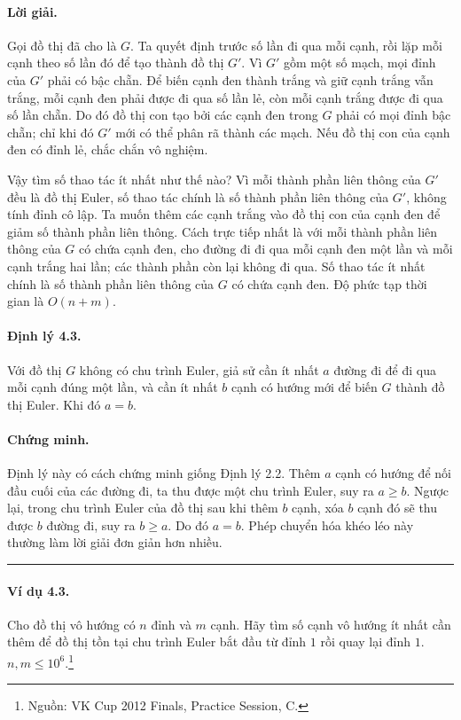 \documentclass[11pt]{article}
\newcommand{\qedmark}{\hfill\rule{0.7ex}{0.7ex}}
\begin{document}
\paragraph{Lời giải.}
Gọi đồ thị đã cho là \(G\). Ta quyết định trước số lần đi qua mỗi cạnh, rồi lặp
mỗi cạnh theo số lần đó để tạo thành đồ thị \(G'\). Vì \(G'\) gồm một số mạch,
mọi đỉnh của \(G'\) phải có bậc chẵn. Để biến cạnh đen thành trắng và giữ cạnh
trắng vẫn trắng, mỗi cạnh đen phải được đi qua số lần lẻ, còn mỗi cạnh trắng
được đi qua số lần chẵn. Do đó đồ thị con tạo bởi các cạnh đen trong \(G\) phải
có mọi đỉnh bậc chẵn; chỉ khi đó \(G'\) mới có thể phân rã thành các mạch. Nếu
đồ thị con của cạnh đen có đỉnh lẻ, chắc chắn vô nghiệm.

Vậy tìm số thao tác ít nhất như thế nào? Vì mỗi thành phần liên thông của
\(G'\) đều là đồ thị Euler, số thao tác chính là số thành phần liên thông của
\(G'\), không tính đỉnh cô lập. Ta muốn thêm các cạnh trắng vào đồ thị con của
cạnh đen để giảm số thành phần liên thông. Cách trực tiếp nhất là với mỗi thành
phần liên thông của \(G\) có chứa cạnh đen, cho đường đi đi qua mỗi cạnh đen
một lần và mỗi cạnh trắng hai lần; các thành phần còn lại không đi qua. Số thao
tác ít nhất chính là số thành phần liên thông của \(G\) có chứa cạnh đen. Độ
phức tạp thời gian là \(O(n+m)\).

\paragraph{Định lý 4.3.}
Với đồ thị \(G\) không có chu trình Euler, giả sử cần ít nhất \(a\) đường đi để
đi qua mỗi cạnh đúng một lần, và cần ít nhất \(b\) cạnh có hướng mới để biến
\(G\) thành đồ thị Euler. Khi đó \(a=b\).

\paragraph{Chứng minh.}
Định lý này có cách chứng minh giống Định lý 2.2. Thêm \(a\) cạnh có hướng để
nối đầu cuối của các đường đi, ta thu được một chu trình Euler, suy ra
\(a\ge b\). Ngược lại, trong chu trình Euler của đồ thị sau khi thêm \(b\) cạnh,
xóa \(b\) cạnh đó sẽ thu được \(b\) đường đi, suy ra \(b\ge a\). Do đó
\(a=b\). Phép chuyển hóa khéo léo này thường làm lời giải đơn giản hơn nhiều.
\qedmark

\paragraph{Ví dụ 4.3.}
Cho đồ thị vô hướng có \(n\) đỉnh và \(m\) cạnh. Hãy tìm số cạnh vô hướng ít
nhất cần thêm để đồ thị tồn tại chu trình Euler bắt đầu từ đỉnh \(1\) rồi quay
lại đỉnh \(1\). \(n,m\le 10^6\).\footnote{Nguồn: VK Cup 2012 Finals, Practice
Session, C.}
\end{document}
